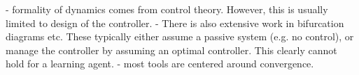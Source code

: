 - formality of dynamics comes from control theory. However, this is usually limited to design of the controller.
- There is also extensive work in bifurcation diagrams etc. These typically either assume a passive system (e.g. no control), or manage the controller by assuming an optimal controller. This clearly cannot hold for a learning agent.
- most tools are centered around convergence.